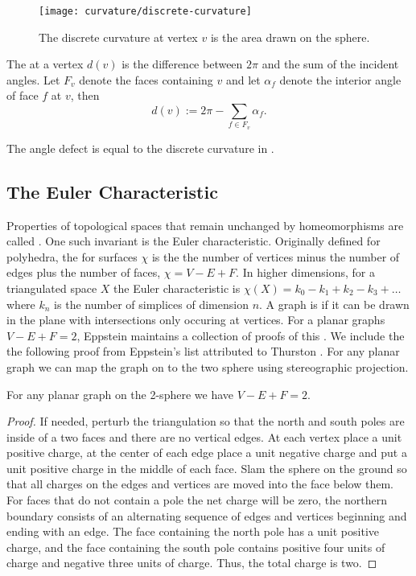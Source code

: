 \begin{figure}[htb]
\centering
\texttt{[image: curvature/discrete-curvature]}
\caption{The discrete curvature at vertex $v$ is the area drawn on the sphere.}
\label{fig:discrete-curvature}
\end{figure}

The  at a vertex $d(v)$ is the difference between $2\pi$ and
the sum of the incident angles.  Let $F_v$ denote the faces containing $v$  
and let $\alpha_f$  denote the interior  angle of face $f$ at $v$, then
$$d(v):=2\pi -\sum_{f\in F_v}\alpha_f.$$

The angle defect is equal to the discrete curvature in .

\subsection{The Euler Characteristic}

Properties of topological spaces that remain unchanged by homeomorphisms are called
. One such invariant is the Euler characteristic.
Originally defined for polyhedra, the  for surfaces $\chi$ is the 
the number of vertices minus the number of edges plus  the number of faces, $\chi=V-E+F.$
In higher dimensions, for a triangulated space $X$ the Euler characteristic is 
$\chi(X)=k_0-k_1+k_2-k_3+\ldots$ where $k_n$ is the number of simplices of dimension $n.$
A  graph  is  if it can be drawn in the plane with intersections only occuring
at vertices.
For a planar graphs $V-E+F=2$, Eppstein maintains a collection of proofs of this \cite{eppstein-proofs}.
We include the the following proof from Eppstein's list attributed to Thurston
 \cite{thurston}. For any planar graph we can map the graph on to the two sphere
 using stereographic projection.
 
\begin{theorem}\label{thm:euler}
For any planar graph on the 2-sphere we have $V-E+F=2.$
\end{theorem}

\begin{proof}
If needed, perturb the triangulation so that the north and south poles are 
inside of a two faces and there are no vertical edges. At each vertex place a unit positive
charge, at the center of each edge place a unit negative charge and put a unit positive
charge in the middle of each face. Slam the sphere on the ground so that all charges
on the edges and vertices are moved into the face below them. For faces that do not contain a pole
the net charge will be zero, the northern boundary consists of an alternating sequence
of edges and vertices  beginning  and ending with an edge.
The face containing the north pole has a unit positive charge, and the face containing the south
pole contains positive four units of charge and negative three units of charge.
Thus, the total charge is two.

\end{proof}
